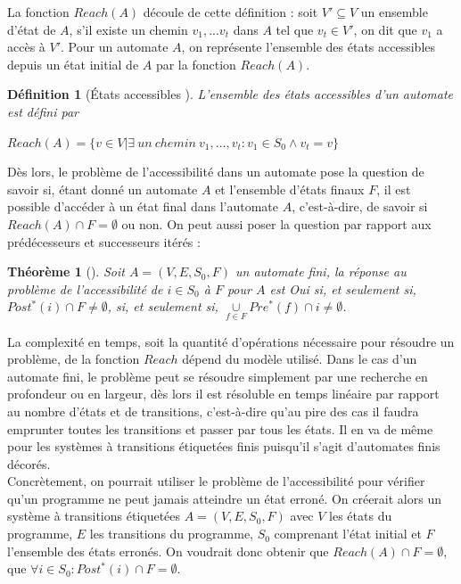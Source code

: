 \documentclass[12pt,a4paper,oneside]{book}
\theoremstyle{break}
\newtheorem{defin}{Définition}[chapter]
\theoremstyle{breakplain}
\newtheorem{theo}{Théorème}[chapter]
\begin{document}
La fonction $Reach(A)$ découle de cette définition : soit $V' \subseteq V$ un ensemble d'état de $A$, s'il existe un chemin $v_1,...v_t$ dans $A$ tel que $v_t \in V'$, on dit que $v_1$ a accès à $V'$. Pour un automate $A$, on représente l'ensemble des états accessibles depuis un état initial de $A$ par la fonction $Reach(A)$.

\begin{defin}[États accessibles \cite{geeraerts2013multiprocessor}]
L'ensemble des états accessibles d'un automate est défini par 
\begin{center}
$Reach(A) = \{v \in V | \exists\ un\ chemin\ v_1,...,v_t : v_1 \in S_0 \wedge v_t = v\}$
\end{center}
\end{defin}

Dès lors, le problème de l'accessibilité dans un automate pose la question de savoir si, étant donné un automate $A$ et l'ensemble d'états finaux $F$, il est possible d'accéder à un état final dans l'automate $A$, c'est-à-dire, de savoir si $Reach(A) \cap F = \emptyset$ ou non. On peut aussi poser la question par rapport aux prédécesseurs et successeurs itérés :

\begin{theo}[\cite{doyen2010antichain}]
Soit $A = (V,E,S_0,F)$ un automate fini, la réponse au problème de l'accessibilité de $i \in S_0$ à $F$ pour $A$ est Oui si, et seulement si, $Post^*(i) \cap F \neq \emptyset$, si, et seulement si, $\underset{f \in F}{\cup}Pre^*(f) \cap i \neq \emptyset$.
\end{theo}

La complexité en temps, soit la quantité d'opérations nécessaire pour résoudre un problème, de la fonction $Reach$ dépend du modèle utilisé. Dans le cas d'un automate fini, le problème peut se résoudre simplement par une recherche en profondeur ou en largeur, dès lors il est résoluble en temps linéaire par rapport au nombre d'états et de transitions, c'est-à-dire qu'au pire des cas il faudra emprunter toutes les transitions et passer par tous les états. Il en va de même pour les systèmes à transitions étiquetées finis puisqu'il s'agit d'automates finis décorés.\\

Concrètement, on pourrait utiliser le problème de l'accessibilité pour vérifier qu'un programme ne peut jamais atteindre un état erroné. On créerait alors un système à transitions étiquetées $A = (V, E, S_0, F)$ avec $V$ les états du programme, $E$ les transitions du programme, $S_0$ comprenant l'état initial et $F$ l'ensemble des états erronés. On voudrait donc obtenir que $Reach(A) \cap F = \emptyset$, que $\forall i \in S_0 : Post^*(i) \cap F = \emptyset$.
\end{document}
